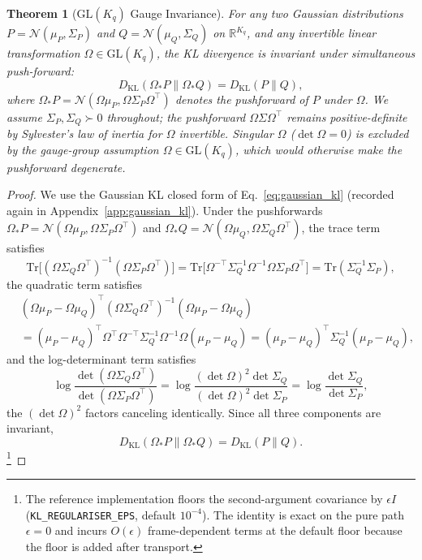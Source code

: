 \documentclass[11pt]{article}
\newtheorem{theorem}{Theorem}
\begin{document}
\begin{theorem}[$\mathrm{GL}(K_q)$ Gauge Invariance]
\label{thm:glk_invariance}
For any two Gaussian distributions $P = \mathcal{N}(\mu_P, \Sigma_P)$ and $Q = \mathcal{N}(\mu_Q, \Sigma_Q)$ on $\mathbb{R}^{K_q}$, and any invertible linear transformation $\Omega \in \mathrm{GL}(K_q)$, the KL divergence is invariant under simultaneous push-forward:
\begin{equation}
D_{\mathrm{KL}}(\Omega_* P \| \Omega_* Q) = D_{\mathrm{KL}}(P \| Q),
\label{eq:glk_invariance}
\end{equation}
where $\Omega_* P = \mathcal{N}(\Omega\mu_P, \Omega\Sigma_P\Omega^\top)$ denotes the pushforward of $P$ under $\Omega$. We assume $\Sigma_P, \Sigma_Q \succ 0$ throughout; the pushforward $\Omega\Sigma\Omega^\top$ remains positive-definite by Sylvester's law of inertia for $\Omega$ invertible. Singular $\Omega$ ($\det\Omega = 0$) is excluded by the gauge-group assumption $\Omega \in \mathrm{GL}(K_q)$, which would otherwise make the pushforward degenerate.
\end{theorem}

\begin{proof}
We use the Gaussian KL closed form of Eq.~\eqref{eq:gaussian_kl} (recorded again in Appendix~\ref{app:gaussian_kl}). Under the pushforwards $\Omega_* P = \mathcal{N}(\Omega\mu_P, \Omega\Sigma_P\Omega^\top)$ and $\Omega_* Q = \mathcal{N}(\Omega\mu_Q, \Omega\Sigma_Q\Omega^\top)$, the trace term satisfies
\begin{equation}
\mathrm{Tr}\big[(\Omega\Sigma_Q\Omega^\top)^{-1}(\Omega\Sigma_P\Omega^\top)\big] = \mathrm{Tr}\big[\Omega^{-\top}\Sigma_Q^{-1}\Omega^{-1}\Omega\Sigma_P\Omega^\top\big] = \mathrm{Tr}(\Sigma_Q^{-1}\Sigma_P),
\end{equation}
the quadratic term satisfies
\begin{align}
&(\Omega\mu_P - \Omega\mu_Q)^\top (\Omega\Sigma_Q\Omega^\top)^{-1} (\Omega\mu_P - \Omega\mu_Q) \nonumber\\
&= (\mu_P - \mu_Q)^\top \Omega^\top \Omega^{-\top}\Sigma_Q^{-1}\Omega^{-1}\Omega (\mu_P - \mu_Q) = (\mu_P - \mu_Q)^\top \Sigma_Q^{-1}(\mu_P - \mu_Q),
\end{align}
and the log-determinant term satisfies
\begin{equation}
\log\frac{\det(\Omega\Sigma_Q\Omega^\top)}{\det(\Omega\Sigma_P\Omega^\top)} = \log\frac{(\det\Omega)^2 \det\Sigma_Q}{(\det\Omega)^2 \det\Sigma_P} = \log\frac{\det\Sigma_Q}{\det\Sigma_P},
\end{equation}
the $(\det\Omega)^2$ factors canceling identically. Since all three components are invariant,
\begin{equation}
D_{\mathrm{KL}}(\Omega_* P \| \Omega_* Q)
= D_{\mathrm{KL}}(P \| Q).
\end{equation}
\footnote{The reference implementation floors the second-argument covariance by $\epsilon I$ (\texttt{KL\_REGULARISER\_EPS}, default $10^{-4}$). The identity is exact on the pure path $\epsilon=0$ and incurs $O(\epsilon)$ frame-dependent terms at the default floor because the floor is added after transport.}
\end{proof}
\end{document}
